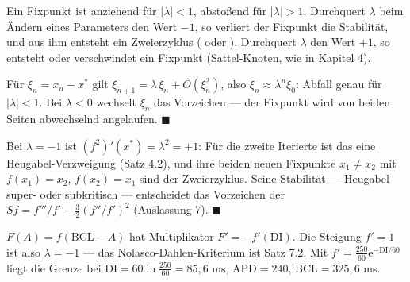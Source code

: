 \begin{merksatz}
Ein Fixpunkt ist anziehend für $|\lambda| < 1$, abstoßend für $|\lambda| > 1$. Durchquert $\lambda$ beim Ändern eines Parameters den Wert $-1$, so verliert der Fixpunkt die Stabilität, und aus ihm entsteht ein Zweierzyklus ( oder ). Durchquert $\lambda$ den Wert $+1$, so entsteht oder verschwindet ein Fixpunkt (Sattel-Knoten, wie in Kapitel 4).

Für $\xi_n = x_n - x^{*}$ gilt $\xi_{n+1} = \lambda\,\xi_n + O(\xi_n^{2})$, also $\xi_n \approx \lambda^{n}\xi_0$: Abfall genau für $|\lambda| < 1$. Bei $\lambda < 0$ wechselt $\xi_n$ das Vorzeichen --- der Fixpunkt wird von beiden Seiten abwechselnd angelaufen. $\blacksquare$

Bei $\lambda = -1$ ist $(f^{2})'(x^{*}) = \lambda^{2} = +1$: Für die zweite Iterierte ist das eine Heugabel-Verzweigung (Satz 4.2), und ihre beiden neuen Fixpunkte $x_1 \ne x_2$ mit $f(x_1) = x_2$, $f(x_2) = x_1$ sind der Zweierzyklus. Seine Stabilität --- Heugabel super- oder subkritisch --- entscheidet das Vorzeichen der  $Sf = f'''/f' - \tfrac32(f''/f')^{2}$ (Auslassung 7). $\blacksquare$

$F(A) = f(\mathrm{BCL} - A)$ hat Multiplikator $F' = -f'(\mathrm{DI})$. Die Steigung $f' = 1$ ist also $\lambda = -1$ --- das Nolasco-Dahlen-Kriterium ist Satz 7.2. Mit $f' = \tfrac{250}{60}\mathrm e^{-\mathrm{DI}/60}$ liegt die Grenze bei $\mathrm{DI} = 60\ln\tfrac{250}{60} = 85{,}6$ ms, $\mathrm{APD} = 240$, $\mathrm{BCL} = 325{,}6$ ms. \checkmark

\begin{center}
\begin{minipage}{0.88\textwidth}
\end{minipage}
\end{center}
\end{merksatz}

